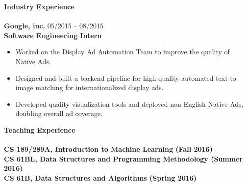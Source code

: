 \documentclass{article}
\begin{document}

\noindent
\textbf{{\Large Industry Experience}}\\[-2mm]
\HRule\\
\textbf{Google, inc.}
\hfill 05/2015 -- 08/2015\\
\textbf{Software Engineering Intern}
\begin{itemize}
\vspace{-2.5mm}
\item Worked on the Display Ad Automation Team to improve the quality of Native Ads.
\vspace{-2.5mm}
\item Designed and built a backend pipeline for high-quality automated text-to-image matching for internationalized display ads.
\vspace{-2.5mm}
\item Developed quality visualization tools and deployed non-English Native Ads, doubling overall ad coverage.
\end{itemize}
\vspace{1mm}

\noindent
\textbf{{\Large Teaching Experience}}\\[-2mm]
\HRule\\
\hspace*{1.1mm}\textbf{CS 189/289A, Introduction to Machine Learning (Fall 2016)} \\
\vspace{0.5mm}
\textbf{CS 61BL, Data Structures and Programming Methodology (Summer 2016)} \\
\vspace{0.5mm}
\textbf{CS 61B, Data Structures and Algorithms (Spring 2016)}
\vspace{2.0mm}
\end{document}
